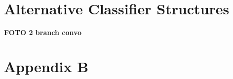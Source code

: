 \chapter{Alternative Classifier Structures} 
\label{app:2bmodel}
\textbf{\large FOTO 2 branch convo}

\chapter{Appendix B}